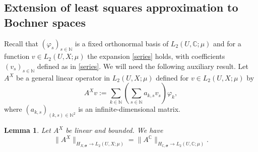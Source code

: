 \documentclass[11pt]{article}
\newtheorem{lemma}{Lemma}[section]
\numberwithin{equation}{section}
\theoremstyle{definition}
\theoremstyle{remark}
\newcommand{\brac}[1]{\left(#1\right)}
\newcommand{\bsigma}{{\boldsymbol{\sigma}}}
\def\NN{{\mathbb N}}
\def\CC{{\mathbb C}}
\def\CC{{\mathbb C}}
\def\NN{{\mathbb N}}
\def\CC{{\mathbb C}}
\def\NN{{\mathbb N}}
\begin{document}
\subsection{Extension of least squares approximation to Bochner spaces}
Recall that $\brac{\varphi_s}_{s \in \NN}$ is {a fixed orthonormal} basis of $L_2(U,\CC;\mu)$ and for a function $v \in L_2(U,X;\mu)$  {the expansion \eqref{series} holds, with coefficients 
$\brac{v_s}_{s \in \NN}$} defined as in \eqref{series}.	We will need the following auxiliary result.		
Let $A^X$ be a general linear operator in $L_2(U,X;\mu)$ defined for $v\in L_2(U,X;\mu)$ by 	
\begin{equation} \label{eq:A}
    {A^Xv := 
    \sum_{k \in \NN} \brac{\sum_{s \in \NN} a_{k,s}	v_s}\varphi_k,}
\end{equation}
where $(a_{k,s})_{(k,s) \in \NN^2}$	 is an infinite-dimensional matrix. 

\begin{lemma} \label{lemma:norms-linear-operators}
    Let $A^X$ be linear and bounded.
    We have
	\begin{equation} \nonumber
		\big\|A^X\big\|_{H_{X,\bsigma}\to L_2(U,X;\mu)}
		=
		\big\|A^{\CC}\big\|_{H_{\CC,\bsigma} \to L_2(U,\CC;\mu)}.
	\end{equation}
\end{lemma}
\end{document}
